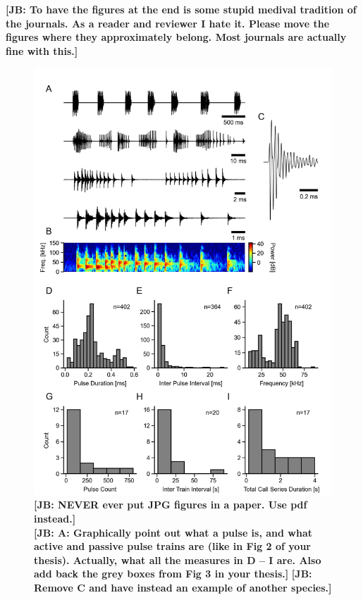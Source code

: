 \documentclass[12pt,a4paper]{article}
\newcommand{\note}[2][]{\textbf{[#1: #2]}}
\newcommand{\notejb}[1]{\note[JB]{#1}}
\begin{document}
\notejb{To have the figures at the end is some stupid medival
  tradition of the journals. As a reader and reviewer I hate
  it. Please move the figures where they approximately belong. Most
  journals are actually fine with this.}
\begin{figure}[h!]
	\centering
	\includegraphics{figures/Fig_01.jpeg}
        \notejb{NEVER ever put JPG figures in a paper. Use pdf instead.}\\
        \notejb{A: Graphically point out what a pulse is, and what active and passive pulse trains are (like in Fig 2 of your thesis). Actually, what all the measures in D -- I are. Also add back the grey boxes from Fig 3 in your thesis.}
        \notejb{Remove C and have instead an example of another species.}

\end{figure}
\end{document}
